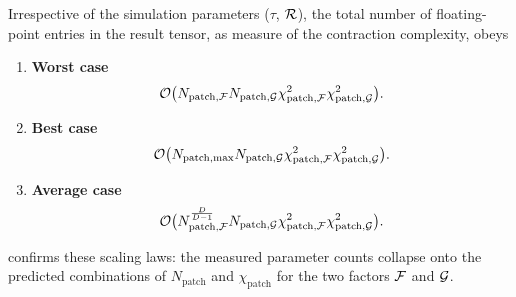 Irrespective of the simulation parameters ($\tau$, $\mathcal{R}$), the total number of floating-point entries in the result tensor, as measure of the contraction complexity, obeys 
\begingroup
\renewcommand{\labelenumi}{(\alph{enumi})}
    \begin{enumerate}
        \item \textbf{Worst case}
        \begin{equation}
          \mathcal{O} \bigl( N_{\text{patch},\mathcal{F}}N_{\text{patch},\mathcal{G}} \chi^2_{\text{patch},\mathcal{F}}\chi^2_{\text{patch},\mathcal{G}} \bigr).
            \label{eq:newworstScalingApp}
        \end{equation}
      \item \textbf{Best case}
        \begin{equation}
          \mathcal{O} \bigl( N_{\text{patch},\text{max}}N_{\text{patch},\mathcal{G}} \chi^2_{\text{patch},\mathcal{F}}\chi^2_{\text{patch},\mathcal{G}} \bigr). 
            \label{eq:newbestScalingApp}
        \end{equation}

     \item \textbf{Average case}
     \begin{equation}
          \mathcal{O} \bigl( N^{\frac{D}{D-1}}_{\text{patch},\mathcal{F}}N_{\text{patch},\mathcal{G}} \chi^2_{\text{patch},\mathcal{F}}\chi^2_{\text{patch},\mathcal{G}} \bigr).
          \label{eq:newaverageScalingApp}
      \end{equation}
    \end{enumerate}
\endgroup

 confirms these scaling laws: the measured parameter counts collapse onto the predicted combinations of \(N_{\text{patch}}\) and \(\chi_{\text{patch}}\) for the two factors $\mathcal{F}$ and $\mathcal{G}$.

